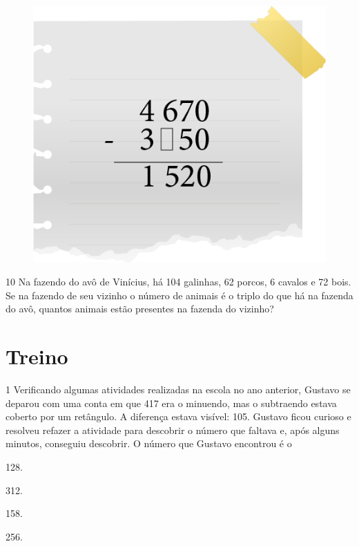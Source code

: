 \begin{figure}[htpb!]
\centering
\includegraphics[width=.5\textwidth]{media/image16.png}
\end{figure}


\num{10} Na fazendo do avô de Vinícius, há 104 galinhas, 62 porcos, 6 cavalos e 72
bois. Se na fazendo de seu vizinho o número de animais é o triplo do que
há na fazenda do avô, quantos animais estão presentes na fazenda do
vizinho?

\begin{mdframed}[linewidth=2pt,linecolor=salmao,roundcorner=2pt]

\vspace{1cm}
\end{mdframed}

\section{Treino}

\num{1} Verificando algumas atividades realizadas na escola no ano anterior,
Gustavo se deparou com uma conta em que 417 era o minuendo, mas o subtraendo
estava coberto por um retângulo. A diferença estava visível: 105.
Gustavo ficou curioso e resolveu refazer a atividade para descobrir o
número que faltava e, após alguns minutos, conseguiu descobrir. O número
que Gustavo encontrou é o

\begin{multicols}{2}
\begin{escolha}
\item
  128.
\item
  312.
\item
  158.
\item
  256.
\end{escolha}
\end{multicols}

